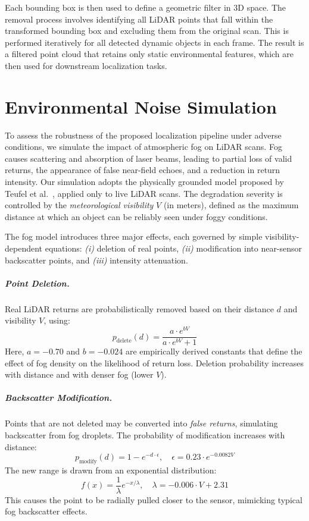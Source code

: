 Each bounding box is then used to define a geometric filter in 3D space. The removal process involves identifying all LiDAR points that fall within the transformed bounding box and excluding them from the original scan. This is performed iteratively for all detected dynamic objects in each frame. The result is a filtered point cloud that retains only static environmental features, which are then used for downstream localization tasks. 


\section{Environmental Noise Simulation}
\label{sec:fog_simulation}

To assess the robustness of the proposed localization pipeline under adverse conditions, we simulate the impact of atmospheric fog on LiDAR scans. Fog causes scattering and absorption of laser beams, leading to partial loss of valid returns, the appearance of false near-field echoes, and a reduction in return intensity. Our simulation adopts the physically grounded model proposed by Teufel et al.~\cite{teufel2022realistic}, applied only to live LiDAR scans. The degradation severity is controlled by the \textit{meteorological visibility} \( V \) (in meters), defined as the maximum distance at which an object can be reliably seen under foggy conditions.

The fog model introduces three major effects, each governed by simple visibility-dependent equations: \textit{(i)} deletion of real points, \textit{(ii)} modification into near-sensor backscatter points, and \textit{(iii)} intensity attenuation.

\subparagraph{Point Deletion.}
Real LiDAR returns are probabilistically removed based on their distance \( d \) and visibility \( V \), using:
\[
p_{\text{delete}}(d) = \frac{a \cdot e^{bV}}{a \cdot e^{bV} + 1}
\]
Here, \( a = -0.70 \) and \( b = -0.024 \) are empirically derived constants that define the effect of fog density on the likelihood of return loss. Deletion probability increases with distance and with denser fog (lower \( V \)).

\subparagraph{Backscatter Modification.}
Points that are not deleted may be converted into \textit{false returns}, simulating backscatter from fog droplets. The probability of modification increases with distance:
\[
p_{\text{modify}}(d) = 1 - e^{-d \cdot \epsilon}, \quad \epsilon = 0.23 \cdot e^{-0.0082V}
\]
The new range is drawn from an exponential distribution:
\[
f(x) = \frac{1}{\lambda} e^{-x / \lambda}, \quad \lambda = -0.006 \cdot V + 2.31
\]
This causes the point to be radially pulled closer to the sensor, mimicking typical fog backscatter effects.

